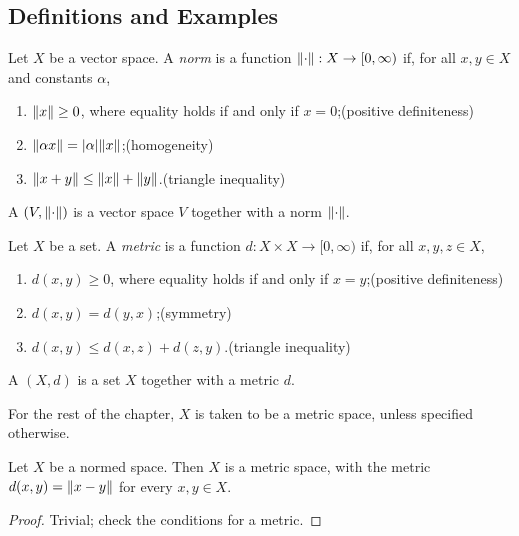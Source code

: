 \subsection{Definitions and Examples}
\begin{definition}
Let $X$ be a vector space. A \emph{norm} is a function $\norm{\cdot}:X\to[0,\infty)$ if, for all $x,y\in X$ and constants $\alpha$,
\begin{enumerate}[label=(\roman*)]
\item $\norm{x}\ge0$, where equality holds if and only if $x=0$;\hfill(positive definiteness)
\item $\norm{\alpha x}=|\alpha|\norm{x}$;\hfill(homogeneity)
\item $\norm{x+y}\le\norm{x}+\norm{y}$.\hfill(triangle inequality)
\end{enumerate}
A  $\left(V,\norm{\cdot}\right)$ is a vector space $V$ together with a norm $\norm{\cdot}$.
\end{definition}

\begin{definition}
Let $X$ be a set. A \emph{metric} is a function $d:X\times X\to[0,\infty)$ if, for all $x,y,z\in X$,
\begin{enumerate}[label=(\roman*)]
\item $d(x,y)\ge0$, where equality holds if and only if $x=y$;\hfill(positive definiteness)
\item $d(x,y)=d(y,x)$;\hfill(symmetry)
\item $d(x,y)\le d(x,z)+d(z,y)$.\hfill(triangle inequality)
\end{enumerate}
A  $(X,d)$ is a set $X$ together with a metric $d$.
\end{definition}

For the rest of the chapter, $X$ is taken to be a metric space, unless specified otherwise.

\begin{lemma}
Let $X$ be a normed space. Then $X$ is a metric space, with the metric $d(x,y)=\norm{x-y}$ for every $x,y\in X$.
\end{lemma}

\begin{proof}
Trivial; check the conditions for a metric.
\end{proof}

